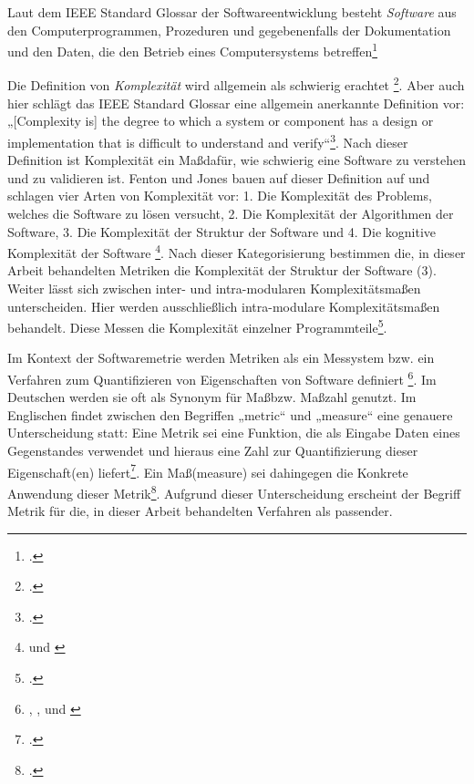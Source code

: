 Laut dem \ac{IEEE} Standard Glossar der Softwareentwicklung besteht
\emph{Software} aus den Computerprogrammen, Prozeduren und
gegebenenfalls der Dokumentation und den Daten, die den Betrieb eines
Computersystems betreffen\footcite[Vgl. ][S. 66]{IEEEStandardGlossary}

Die Definition von \emph{Komplexität} wird allgemein als schwierig
erachtet \footcite[Vgl. ][S. 335 und 627]{jonesAppliedSoftwareMeasurement2008}.
Aber auch hier schlägt das \ac{IEEE} Standard Glossar eine allgemein
anerkannte Definition vor: „{[}Complexity is{]} the degree to which a
system or component has a design or implementation that is difficult to
understand and verify``\footcite[Vgl. ][S. 18]{IEEEStandardGlossary}. Nach dieser
Definition ist Komplexität ein Ma\ss  dafür, wie schwierig eine Software zu
verstehen und zu validieren ist. Fenton und Jones bauen auf dieser
Definition auf und schlagen vier Arten von Komplexität vor: 1. Die
Komplexität des Problems, welches die Software zu lösen versucht, 2. Die
Komplexität der Algorithmen der Software, 3. Die Komplexität der
Struktur der Software und 4. Die kognitive Komplexität der
Software \footnote{\cite[Vgl. ][S. 258]{fentonSoftwareMetricsRigorous2003} und \cite[][S. 449]{jonesAppliedSoftwareMeasurement2008}}. Nach dieser Kategorisierung bestimmen die, in dieser
Arbeit behandelten Metriken die Komplexität der Struktur der Software
(3). Weiter lässt sich zwischen inter- und intra-modularen
Komplexitätsma\ss en unterscheiden. Hier werden ausschlie\ss lich
intra-modulare Komplexitätsma\ss en behandelt. Diese Messen die Komplexität
einzelner Programmteile\footcite[Vgl. ][S. 7ff]{zuseSoftwareComplexityMeasures1991}.

Im Kontext der Softwaremetrie werden Metriken als ein Messystem bzw. ein
Verfahren zum Quantifizieren von Eigenschaften von Software
definiert \footnote{\cite[Vgl. ][S. 35ff]{dumkeTheorieUndPraxis1994}, \cite[][S. 4ff]{ebertSoftwareMetrikenPraxisEinfuhrung1996}, \cite[][]{augstenWasSindSoftwaremetriken} und \cite[][S. 2f]{IEEEStandardSoftware}}. Im Deutschen werden sie oft als Synonym für Ma\ss  bzw. Ma\ss zahl
genutzt. Im Englischen findet zwischen den Begriffen „metric`` und
„measure`` eine genauere Unterscheidung statt: Eine Metrik sei eine
Funktion, die als Eingabe Daten eines Gegenstandes verwendet und hieraus
eine Zahl zur Quantifizierung dieser Eigenschaft(en) liefert\footcite[Vgl. ][S. 3]{IEEEStandardSoftware}. Ein Ma\ss  (measure) sei dahingegen die Konkrete Anwendung dieser
Metrik\footcite[Vgl. ][S. 2]{IEEEStandardSoftware}. Aufgrund dieser
Unterscheidung erscheint der Begriff Metrik für die, in dieser Arbeit
behandelten Verfahren als passender.

